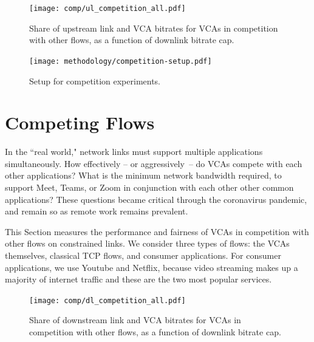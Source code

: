   
 \begin{figure}[t]
    \texttt{[image: comp/ul\_competition\_all.pdf]}
    \caption{Share of upstream link and VCA bitrates for VCAs in competition with other flows, as a function of downlink bitrate cap.}
	\label{fig:comp_bitrates_ul}
\end{figure}



\begin{figure}[]
   \centering
    \texttt{[image: methodology/competition-setup.pdf]}
    \caption{Setup for competition experiments.}
    \label{fig:competition-setup}
\end{figure}


\section{Competing Flows}

In the ``real world," network links must support multiple applications simultaneously.
How effectively -- or aggressively~-- do VCAs compete with each other applications?
What is the minimum network bandwidth required, to support Meet, Teams, or Zoom 
    in conjunction with each other other common applications?
These questions became critical through the coronavirus pandemic,
  and remain so as remote work remains prevalent.
    
This Section measures the performance and fairness of VCAs
    in competition with other flows on constrained links.
We consider three types of flows: 
  the VCAs themselves, classical TCP flows, and consumer applications.
For consumer applications, we use Youtube and Netflix,
  because video streaming makes up a majority of internet traffic and 
  these are the two most popular services.



\begin{figure}[t]
    \texttt{[image: comp/dl\_competition\_all.pdf]}
    \caption{Share of downstream link and VCA bitrates for VCAs in competition with other flows, as a function of downlink bitrate cap.}
	\label{fig:comp_bitrates_dl}
\end{figure}

